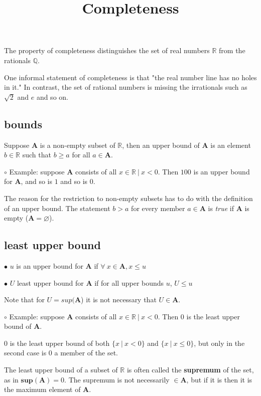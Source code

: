 \documentclass[11pt, oneside]{article}
\title{Completeness}
\date{}
\begin{document}
\maketitle
\Large

The property of completeness distinguishes the set of real numbers $\mathbb{R}$ from the rationals  $\mathbb{Q}$.

One informal statement of completeness is that "the real number line has no holes in it."  In contrast, the set of rational numbers is missing the irrationals such as $\sqrt{2}$ and $e$ and so on.

\subsection*{bounds}

Suppose $\mathbf{A}$ is a non-empty subset of $\mathbb{R}$, then an upper bound of $\mathbf{A}$ is an element $b \in \mathbb{R}$ such that $b \ge a$ for all $a \in \mathbf{A}$.

$\circ$  Example:  suppose $\mathbf{A}$ consists of all $x \in \mathbb{R} \ | \ x < 0$.  Then $100$ is an upper bound for $\mathbf{A}$, and so is $1$ and so is $0$.

The reason for the restriction to non-empty subsets has to do with the definition of an upper bound.  The statement $b > a$ for every member $a \in \mathbf{A}$ is \emph{true} if  $\mathbf{A}$ is empty ($\mathbf{A} = \varnothing$).

\subsection*{least upper bound}

$\bullet$  $u$ is an upper bound for $\mathbf{A}$ if $\forall \ x \in \mathbf{A}, x \le u$

$\bullet$  $U$ least upper bound for $\mathbf{A}$ if for all upper bounds $u$, $U \le u$

Note that for $U = sup(\mathbf{A}$) it is not necessary that $U \in \mathbf{A}$.

$\circ$  Example:  suppose $\mathbf{A}$ consists of all $x \in \mathbb{R} \ | \ x < 0$.  Then $0$ is the least upper bound of $\mathbf{A}$.

$0$ is the least upper bound of both $\{x \ | \ x < 0\}$ and $\{x \ | \ x \le 0\}$, but only in the second case is $0$ a member of the set.

The least upper bound of a subset of $\mathbb{R}$ is often called the \textbf{supremum} of the set, as in $\mathbf{sup}(\mathbf{A}) = 0$.  The supremum is not necessarily $\in \mathbf{A}$, but if it is then it is the maximum element of $\mathbf{A}$.
\end{document}
